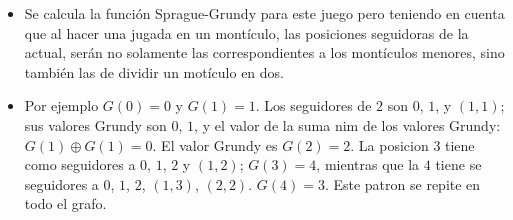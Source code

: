 \begin{itemize}
{\begin{itemize}
{				en dos pilas no vac\'ias, sin quitar ninguna ficha del juego.
			}
			\item{
				Se calcula la funci\'on Sprague-Grundy para este juego pero teniendo en cuenta que al hacer 
				una jugada en un mont\'iculo, las posiciones seguidoras de la actual, ser\'an no solamente 
				las correspondientes a los mont\'iculos menores, sino tambi\'en las de dividir un mot\'iculo 
				en dos.
			}
			\item{
				Por ejemplo $G(0) = 0$ y $G(1) = 1$. Los seguidores de $2$ son $0$, $1$, y $(1, 1)$; sus valores 
				Grundy son $0$, $1$, y el valor de la suma nim de los valores Grundy: $G(1) \oplus G(1) = 0$. 
				El valor Grundy es $G(2) = 2$. La posicion $3$ tiene como seguidores a $0$, $1$, $2$ y $(1, 2)$; 
				$G(3) = 4$, mientras que la $4$ tiene se seguidores a $0$, $1$, $2$, $(1, 3)$, $(2, 2)$. $G(4) = 3$. 
				Este patron se repite en todo el grafo.       
			}
		\end{itemize}
    }
\end{itemize}
